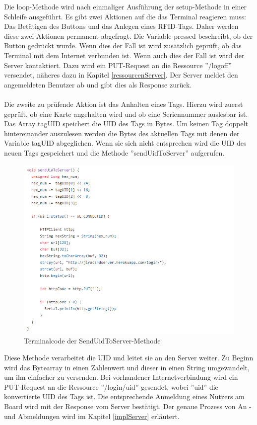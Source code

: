 \documentclass[12pt,titlepage]{scrartcl}
\begin{document}
		\noindent Die loop-Methode wird nach einmaliger Ausführung der setup-Methode in einer Schleife ausgeführt. Es gibt zwei Aktionen auf die das Terminal reagieren muss: Das Betätigen des Buttons und das Anlegen eines RFID-Tags. Daher werden diese zwei Aktionen permanent abgefragt. Die Variable pressed beschreibt, ob der Button gedrückt wurde. Wenn dies der Fall ist wird zusätzlich geprüft, ob das Terminal mit dem Internet verbunden ist. Wenn auch dies der Fall ist wird der Server kontaktiert. Dazu wird ein PUT-Request an die Ressource ''/logoff'' versendet, näheres dazu in Kapitel \ref{ressourcenServer}. Der Server meldet den angemeldeten Benutzer ab und gibt dies als Response zurück. \\ \\
		Die zweite zu prüfende Aktion ist das Anhalten eines Tags. Hierzu wird zuerst geprüft, ob eine Karte angehalten wird und ob eine Seriennummer auslesbar ist. Das Array tagUID speichert die UID des Tags in Bytes. Um keinen Tag doppelt hintereinander auszulesen werden die Bytes des aktuellen Tags mit denen der Variable tagUID abgeglichen. Wenn sie sich nicht entsprechen wird die UID des neuen Tags gespeichert und die Methode ''sendUidToServer'' aufgerufen.  \\
		\begin{figure}[H] 
  			\centering
    		\includegraphics[height=0.5\textheight]{terminalSendUid}
  			\caption{Terminalcode der SendUidToServer-Methode}
  			\label{fig:terminalSendUid}
		\end{figure}
		\noindent Diese Methode verarbeitet die UID und leitet sie an den Server weiter. Zu Beginn wird das Bytearray in einen Zahlenwert und dieser in einen String umgewandelt, um ihn einfacher zu versenden. Bei vorhandener Internetverbindung wird ein PUT-Request an die Ressource ''/login/uid'' gesendet, wobei ''uid'' die konvertierte UID des Tags ist. Die entsprechende Anmeldung eines Nutzers am Board wird mit der Response vom Server bestätigt. Der genaue Prozess von An -und Abmeldungen wird im Kapitel \ref{implServer} erläutert.
\end{document}
